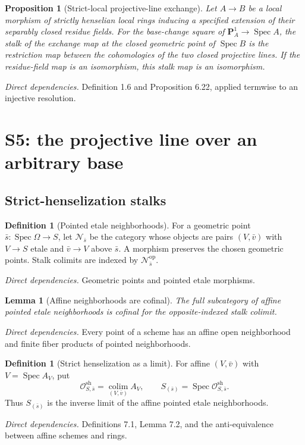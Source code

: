 \documentclass[10pt]{article}
\newtheorem{proposition}[theorem]{Proposition}
\newtheorem{lemma}[theorem]{Lemma}
\theoremstyle{definition}
\newtheorem{definition}[theorem]{Definition}
\newcommand{\Spec}{\operatorname{Spec}}
\newcommand{\colim}{\operatorname*{colim}}
\newcommand{\deps}[1]{\par\smallskip\textit{Direct dependencies.} #1\par}
\begin{document}
\begin{proposition}[Strict-local projective-line exchange]
Let $A\to B$ be a local morphism of strictly henselian local rings
inducing a specified extension of their separably closed residue fields.
For the base-change square of $\mathbf P^1_A\to\Spec A$, the stalk of the
exchange map at the closed geometric point of $\Spec B$ is the restriction
map between the cohomologies of the two closed projective lines.  If the
residue-field map is an isomorphism, this stalk map is an isomorphism.
\end{proposition}
\deps{Definition 1.6 and Proposition 6.22, applied termwise to an injective
resolution.}

\section{S5: the projective line over an arbitrary base}

\subsection{Strict-henselization stalks}

\begin{definition}[Pointed etale neighborhoods]
For a geometric point $\bar s:\Spec\Omega\to S$, let
$\mathcal N_{\bar s}$ be the category whose objects are pairs
$(V,\bar v)$ with $V\to S$ etale and $\bar v\to V$ above $\bar s$.
A morphism preserves the chosen geometric points.  Stalk colimits are
indexed by $\mathcal N_{\bar s}^{\mathrm{op}}$.
\end{definition}
\deps{Geometric points and pointed etale morphisms.}

\begin{lemma}[Affine neighborhoods are cofinal]
The full subcategory of affine pointed etale neighborhoods is cofinal for
the opposite-indexed stalk colimit.
\end{lemma}
\deps{Every point of a scheme has an affine open neighborhood and finite
fiber products of pointed neighborhoods.}

\begin{definition}[Strict henselization as a limit]
For affine $(V,\bar v)$ with $V=\Spec A_V$, put
\[
 \mathcal O^{\mathrm{sh}}_{S,\bar s}
   =\colim_{(V,\bar v)}A_V,
 \qquad
 S_{(\bar s)}=\Spec\mathcal O^{\mathrm{sh}}_{S,\bar s}.
\]
Thus $S_{(\bar s)}$ is the inverse limit of the affine pointed etale
neighborhoods.
\end{definition}
\deps{Definitions 7.1, Lemma 7.2, and the anti-equivalence between affine
schemes and rings.}
\end{document}
